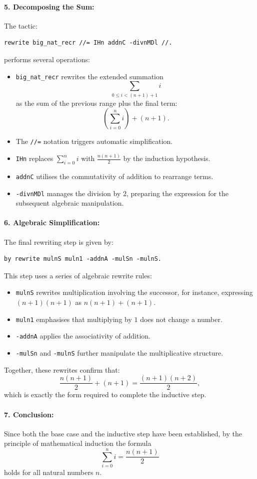 \documentclass[10pt,nonacm,natbib=false]{acmart}
\begin{document}
\paragraph{5. Decomposing the Sum:}
The tactic:
\begin{verbatim}
rewrite big_nat_recr //= IHn addnC -divnMDl //.
\end{verbatim}
performs several operations:
\begin{itemize}
    \item \texttt{big\_nat\_recr} rewrites the extended summation 
    \[
    \sum_{0 \le i < (n+1)+1} i
    \]
    as the sum of the previous range plus the final term:
    \[
    \left(\sum_{i=0}^{n} i\right) + (n+1).
    \]
    \item The \texttt{//=} notation triggers automatic simplification.
    \item \texttt{IHn} replaces \(\sum_{i=0}^{n} i\) with \(\frac{n(n+1)}{2}\) by the induction hypothesis.
    \item \texttt{addnC} utilises the commutativity of addition to rearrange terms.
    \item \texttt{-divnMDl} manages the division by \( 2 \), preparing the expression for the subsequent algebraic manipulation.
\end{itemize}

\paragraph{6. Algebraic Simplification:}
The final rewriting step is given by:
\begin{verbatim}
by rewrite mulnS muln1 -addnA -mulSn -mulnS.
\end{verbatim}
This step uses a series of algebraic rewrite rules:
\begin{itemize}
    \item \texttt{mulnS} rewrites multiplication involving the successor, for instance, expressing \((n+1)(n+1)\) as \( n(n+1) + (n+1) \).
    \item \texttt{muln1} emphasises that multiplying by \( 1 \) does not change a number.
    \item \texttt{-addnA} applies the associativity of addition.
    \item \texttt{-mulSn} and \texttt{-mulnS} further manipulate the multiplicative structure.
\end{itemize}
Together, these rewrites confirm that:
\[
\frac{n(n+1)}{2} + (n+1) = \frac{(n+1)(n+2)}{2},
\]
which is exactly the form required to complete the inductive step.

\paragraph{7. Conclusion:}
Since both the base case and the inductive step have been established, by the principle of mathematical induction the formula
\[
\sum_{i=0}^{n} i = \frac{n(n+1)}{2}
\]
holds for all natural numbers \( n \).


\newpage


\end{document}
